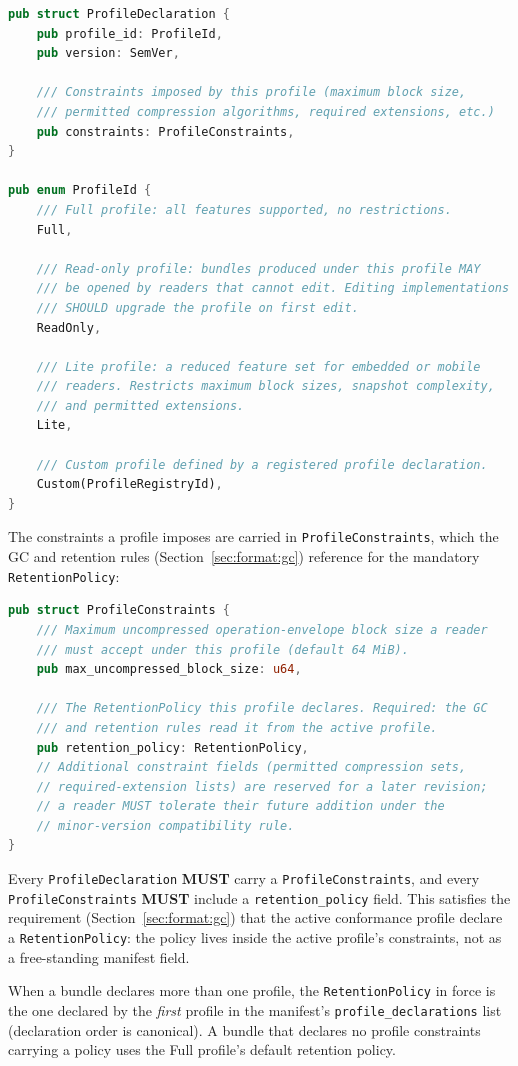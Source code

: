 \documentclass[11pt,letterpaper]{report}
\newcounter{requirement}[chapter]
\newcommand{\MUST}{\textbf{MUST}}
\begin{document}
\begin{lstlisting}[language=Rust]
pub struct ProfileDeclaration {
    pub profile_id: ProfileId,
    pub version: SemVer,

    /// Constraints imposed by this profile (maximum block size,
    /// permitted compression algorithms, required extensions, etc.)
    pub constraints: ProfileConstraints,
}

pub enum ProfileId {
    /// Full profile: all features supported, no restrictions.
    Full,

    /// Read-only profile: bundles produced under this profile MAY
    /// be opened by readers that cannot edit. Editing implementations
    /// SHOULD upgrade the profile on first edit.
    ReadOnly,

    /// Lite profile: a reduced feature set for embedded or mobile
    /// readers. Restricts maximum block sizes, snapshot complexity,
    /// and permitted extensions.
    Lite,

    /// Custom profile defined by a registered profile declaration.
    Custom(ProfileRegistryId),
}
\end{lstlisting}

The constraints a profile imposes are carried in
\texttt{ProfileConstraints}, which the GC and retention rules
(Section~\ref{sec:format:gc}) reference for the mandatory
\texttt{RetentionPolicy}:

\begin{lstlisting}[language=Rust]
pub struct ProfileConstraints {
    /// Maximum uncompressed operation-envelope block size a reader
    /// must accept under this profile (default 64 MiB).
    pub max_uncompressed_block_size: u64,

    /// The RetentionPolicy this profile declares. Required: the GC
    /// and retention rules read it from the active profile.
    pub retention_policy: RetentionPolicy,
    // Additional constraint fields (permitted compression sets,
    // required-extension lists) are reserved for a later revision;
    // a reader MUST tolerate their future addition under the
    // minor-version compatibility rule.
}
\end{lstlisting}

\begin{requirement}
  \label{req:format:profile-constraints}
  Every \texttt{ProfileDeclaration} \MUST{} carry a
  \texttt{ProfileConstraints}, and every \texttt{ProfileConstraints}
  \MUST{} include a \texttt{retention\_policy} field. This satisfies
  the requirement (Section~\ref{sec:format:gc}) that the active
  conformance profile declare a \texttt{RetentionPolicy}: the policy
  lives inside the active profile's constraints, not as a free-standing
  manifest field.

  When a bundle declares more than one profile, the
  \texttt{RetentionPolicy} in force is the one declared by the
  \emph{first} profile in the manifest's \texttt{profile\_declarations}
  list (declaration order is canonical). A bundle that declares no
  profile constraints carrying a policy uses the Full profile's
  default retention policy.
\end{requirement}
\end{document}
